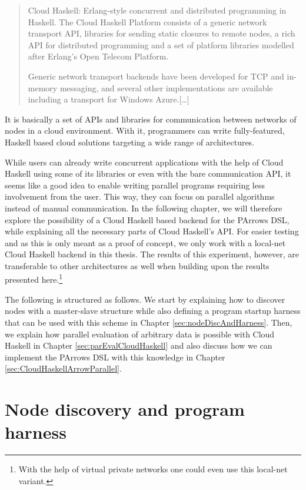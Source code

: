 \documentclass[paper=A4,twoside=true,openright,parskip=full,chapterprefix=true,headings=normal,bibliography=totoc,listof=totoc,titlepage=on,captions=tableabove,draft=false,british]{scrreprt}%
\begin{document}
\begin{quote}
Cloud Haskell: Erlang-style concurrent and distributed programming in
Haskell. The Cloud Haskell Platform consists of a generic network
transport API, libraries for sending static closures to remote nodes, a
rich API for distributed programming and a set of platform libraries
modelled after Erlang's Open Telecom Platform.

Generic network transport backends have been developed for TCP and
in-memory messaging, and several other implementations are available
including a transport for Windows Azure.{[}\ldots{}{]}
\end{quote}

It is basically a set of APIs and libraries for communication between
networks of nodes in a cloud environment. With it, programmers can write
fully-featured, Haskell based cloud solutions targeting a wide range of
architectures.

While users can already write concurrent applications with the help of
Cloud Haskell using some of its libraries or even with the bare
communication API, it seems like a good idea to enable writing parallel
programs requiring less involvement from the user. This way, they can
focus on parallel algorithms instead of manual communication. In the
following chapter, we will therefore explore the possibility of a Cloud
Haskell based backend for the PArrows DSL, while explaining all the
necessary parts of Cloud Haskell's API. For easier testing and as this
is only meant as a proof of concept, we only work with a local-net Cloud
Haskell backend in this thesis. The results of this experiment, however,
are transferable to other architectures as well when building upon the
results presented here.\footnote{With the help of virtual private
  networks one could even use this local-net variant.}

The following is structured as follows. We start by explaining how to
discover nodes with a master-slave structure while also defining a
program startup harness that can be used with this scheme in Chapter
\ref{sec:nodeDiscAndHarness}. Then, we explain how parallel evaluation
of arbitrary data is possible with Cloud Haskell in Chapter
\ref{sec:parEvalCloudHaskell} and also discuss how we can implement the
PArrows DSL with this knowledge in Chapter
\ref{sec:CloudHaskellArrowParallel}.

\hypertarget{node-discovery-and-program-harness}{%
\section{Node discovery and program
harness}\label{node-discovery-and-program-harness}}
\end{document}
